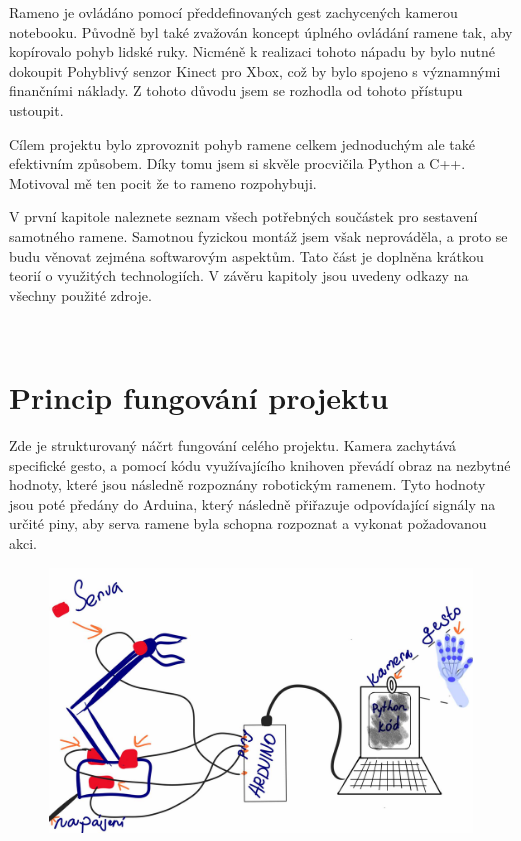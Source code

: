 \documentclass[12pt, a4paper,
twoside,        %
openright
]{report}
\let\oldchapter\chapter
\renewcommand{\chapter}{
	\clearpage
	\pagestyle{fancy}
	\fancyhf{}
	\renewcommand{\headrulewidth}{0pt}
	\fancyfoot[c]{\thepage}
	\
	\oldchapter
}
\renewcommand{\headrulewidth}{0.025pt}
\begin{document}
{Rameno je ovládáno pomocí předdefinovaných gest zachycených kamerou notebooku. Původně byl také zvažován koncept úplného ovládání ramene tak, aby kopírovalo pohyb lidské ruky. Nicméně k realizaci tohoto nápadu by bylo nutné dokoupit Pohyblivý senzor Kinect pro Xbox, což by bylo spojeno s významnými finančními náklady. Z tohoto důvodu jsem se rozhodla od tohoto přístupu ustoupit.

Cílem projektu bylo zprovoznit pohyb ramene celkem jednoduchým ale také efektivním způsobem. Díky tomu jsem si skvěle procvičila Python a C++. Motivoval mě ten pocit že to rameno rozpohybuji. 


V první kapitole naleznete seznam všech potřebných součástek pro sestavení samotného ramene. Samotnou fyzickou montáž jsem však neprováděla, a proto se budu věnovat zejména softwarovým aspektům. Tato část je doplněna krátkou teorií o využitých technologiích. V závěru kapitoly jsou uvedeny odkazy na všechny použité zdroje.


\chapter{Princip fungování projektu}

Zde je strukturovaný náčrt fungování celého projektu. Kamera zachytává specifické gesto, a pomocí kódu využívajícího knihoven převádí obraz na nezbytné hodnoty, které jsou následně rozpoznány robotickým ramenem. Tyto hodnoty jsou poté předány do Arduina, který následně přiřazuje odpovídající signály na určité piny, aby serva ramene byla schopna rozpoznat a vykonat požadovanou akci.
\begin{figure}[h]
	
	\centering
	\includegraphics[width=0.9\linewidth]{image/princip.jpg} 
	

\end{figure}}
\end{document}
